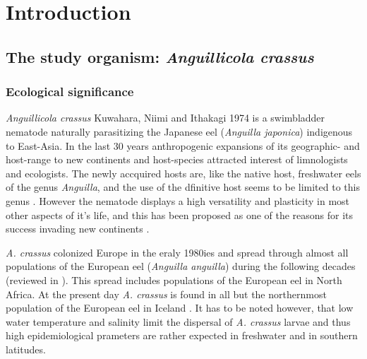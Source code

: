 

\chapter{Introduction}
\label{chap:intro}
\ifpdf
    \graphicspath{{1_introduction/figures/PNG/}{1_introduction/figures/PDF/}{1_introduction/figures/}}
\else
    \graphicspath{{1_introduction/figures/EPS/}{1_introduction/figures/}}
\fi


\section{The study organism: \textit{Anguillicola crassus}} 
\label{stud-org}

\subsection{Ecological significance} 
\label{eco-sig}

\textit{Anguillicola crassus} Kuwahara, Niimi and Ithakagi 1974
\cite{kuwahara_Niimi_Itagaki_1974} is a swimbladder nematode naturally
parasitizing the Japanese eel (\textit{Anguilla japonica}) indigenous
to East-Asia. In the last 30 years anthropogenic expansions of its
geographic- and host-range to new continents and host-species
attracted interest of limnologists and ecologists. The newly accquired
hosts are, like the native host, freshwater eels of the genus
\textit{Anguilla}, and the use of the dfinitive host seems to be
limited to this genus \cite{sures_development_1999}. However the
nematode displays a high versatility and plasticity in most other
aspects of it's life, and this has been proposed as one of the reasons
for its success invading new continents
\cite{taraschewski_hosts_2007}.

\textit{A. crassus} colonized Europe in the eraly 1980ies and spread
through almost all populations of the European eel (\textit{Anguilla
  anguilla}) during the following decades (reviewed in
\cite{kirk_impact_2003}). This spread includes populations of the
European eel in North
Africa\cite{gargouri_ben_abdallah_spatio-temporal_2006,
  loukili_dynamics_2007}. At the present day \textit{A. crassus} is
found in all but the northernmost population of the European eel in
Iceland \cite{kristmundsson_parasite_2007}. It has to be noted
however, that low water temperature \cite{knopf_impact_1998} and
salinity \cite{kirk_effect_2000} limit the dispersal of
\textit{A. crassus} larvae and thus high epidemiological prameters are
rather expected in freshwater and in southern latitudes.

